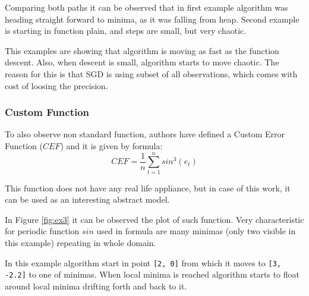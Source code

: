 \documentclass[11pt,a4paper]{IEEEtran}
\begin{document}
Comparing both paths it can be observed that in first example algorithm was heading straight forward to minima, as it was falling from heap. Second example is starting in function plain, and steps are small, but very chaotic.

This examples are showing that algorithm is moving as fast as the function descent. Also, when descent is small, algorithm starts to move chaotic. The reason for this is that SGD is using subset of all observations, which comes with cost of loosing the precision.
\\

\subsubsection{Custom Function}

To also observe non standard function, authors have defined a Custom Error Function ($CEF$) and it is given by formula:
$$ CEF = \frac{1}{n}\sum_{t=1}^{n}sin^3(e_t) $$

This function does not have any real life appliance, but in case of this work, it can be used as an interesting abstract model.

In Figure \ref{fig:ex3} it can be observed the plot of such function. Very characteristic for periodic function $sin$ used in formula are many minimas (only two visible in this example) repeating in whole domain.

In this example algorithm start in point \texttt{[2, 0]} from which it moves to \texttt{[3, -2.2]} to one of minimas. When local minima is reached algorithm starts to float around local minima drifting forth and back to it.
\end{document}
